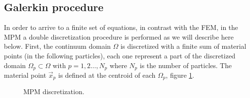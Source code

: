 \subsection{Galerkin procedure}
\label{sec:Galerkin-procedure}
In order to arrive to a finite set of equations, in contrast with the
FEM, in the MPM a double discretization procedure is performed as we will
describe here below. First, the continuum domain
$\Omega$ is discretized with a finite sum of material points (in the
following particles), each one
represent a part of the discretized domain $\varOmega_p \subset
\varOmega$ with $p = 1,2\ldots ,N_p$ where $N_p$ is the number of
particles. The material point $\vec{x}_p$ is defined at the centroid
of each $\Omega_p$, figure \ref{fig:MPM-discretization}.
\begin{figure}\sidecaption
  \centering
  \caption{MPM discretization.}
  \label{fig:MPM-discretization}
\end{figure}

